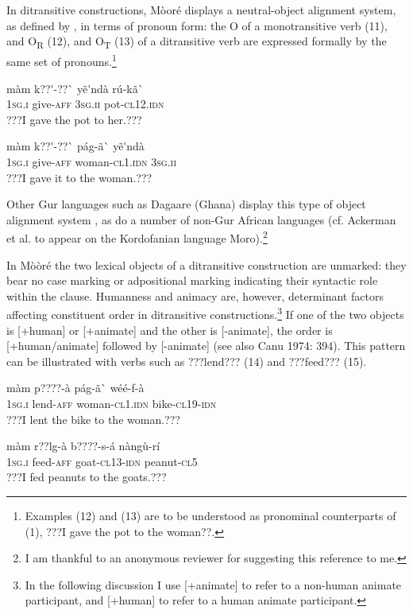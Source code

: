 \documentclass[output=paper]{langsci/langscibook}
\begin{document}
In ditransitive constructions, Mòoré displays a neutral-object alignment system, as defined by \citet{MalchukovEtAl2010}, in terms of pronoun form: the O of a monotransitive verb (11), and O\textsubscript{R} (12), and O\textsubscript{T} (13) of a ditransitive verb are expressed formally by the same set of pronouns.\footnote{{ }Examples (12) and (13) are to be understood as pronominal counterparts of (1), ???I gave the pot to the woman??.  } 

\ea 
\gll  màm    k??\'{ }-??\`{ }      yẽ\'{ }ndà    rú-kã\`{ } \\
%
\textsc{1sg.i  }  give-\textsc{aff}    \textsc{3sg.ii  }  pot\textsc{{}-cl12.idn}\\
\glt
???I gave the pot to her.???
\z

\ea 
\gll  màm    k??\'{ }-??\`{ }    pág-ã\`{ }      yẽ\'{ }ndà\\
%
\textsc{1sg.i  }  give-\textsc{aff}  woman-\textsc{cl1.idn}  \textsc{3sg.ii}
\\\glt
???I gave it to the woman.???
\z

Other Gur languages such as Dagaare (Ghana) display this type of object alignment system \citep{Bodomo1997}, as do a number of non-Gur African languages (cf. Ackerman et al. to appear on the Kordofanian language Moro).\footnote{ I am thankful to an anonymous reviewer for suggesting this reference to me.  }{ }


In Mòòré the two lexical objects of a ditransitive construction are unmarked: they bear no case marking or adpositional marking indicating their syntactic role within the clause. Humanness and animacy are, however, determinant factors affecting constituent order in ditransitive constructions.\footnote{ In the following discussion I use [+animate] to refer to a non-human animate participant, and [+human] to refer to a human animate participant.}{ }If one of the two objects is [+human] or [+animate] and the other is [-animate], the order is [+human/animate] followed by [-animate] (see also Canu 1974: 394). This pattern can be illustrated with verbs such as ???lend??? (14) and ???feed??? (15).

\ea \gll 
\label{bkm:Ref424142726}màm    p????-à         pág-ã\`{ }      wéé-f-à
\\
%
\textsc{1sg.i  }  lend-\textsc{aff}        woman-\textsc{cl1.idn}  bike-\textsc{cl19-idn}
\\\glt
???I lent the bike to the woman.???
\z

\ea \gll 
\label{bkm:Ref424142734}màm    r??lg-à      b????-s-á    nàngù-rí
\\
%
\textsc{1sg.i  }  feed-\textsc{aff}    goat-\textsc{cl13-idn}  peanut-\textsc{cl5}
\\\glt
???I fed peanuts to the goats.???
\z
\end{document}
